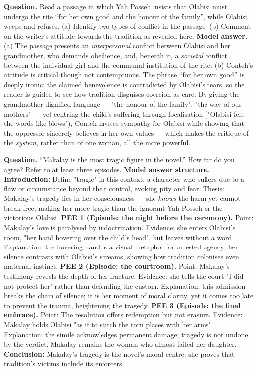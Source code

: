 \documentclass[11pt]{article}
\begin{document}
\begin{exoresolu}
\textbf{Question.} Read a passage in which Yah Posseh insists that Olabisi must undergo the rite ``for her own good and the honour of the family'', while Olabisi weeps and refuses. (a) Identify two types of conflict in the passage. (b) Comment on the writer's attitude towards the tradition as revealed here.
\tcblower
\textbf{Model answer.} (a) The passage presents an \emph{interpersonal} conflict between Olabisi and her grandmother, who demands obedience, and, beneath it, a \emph{societal} conflict between the individual girl and the communal institution of the rite. (b) Conteh's attitude is critical though not contemptuous. The phrase ``for her own good'' is deeply ironic: the claimed benevolence is contradicted by Olabisi's tears, so the reader is guided to see how tradition disguises coercion as care. By giving the grandmother dignified language --- "the honour of the family", "the way of our mothers" --- yet centring the child's suffering through focalisation ("Olabisi felt the words like blows"), Conteh invites sympathy for Olabisi while showing that the oppressor sincerely believes in her own values --- which makes the critique of the \emph{system}, rather than of one woman, all the more powerful.
\end{exoresolu}

\begin{exoresolu}
\textbf{Question.} ``Makalay is the most tragic figure in the novel.'' How far do you agree? Refer to at least three episodes.
\tcblower
\textbf{Model answer structure.}
\textbf{Introduction:} Define "tragic" in this context: a character who suffers due to a flaw or circumstance beyond their control, evoking pity and fear. Thesis: Makalay's tragedy lies in her consciousness --- she \emph{knows} the harm yet cannot break free, making her more tragic than the ignorant Yah Posseh or the victorious Olabisi.
\textbf{PEE 1 (Episode: the night before the ceremony).} Point: Makalay's love is paralysed by indoctrination. Evidence: she enters Olabisi's room, "her hand hovering over the child's head", but leaves without a word. Explanation: the hovering hand is a visual metaphor for arrested agency; her silence contrasts with Olabisi's screams, showing how tradition colonises even maternal instinct.
\textbf{PEE 2 (Episode: the courtroom).} Point: Makalay's testimony reveals the depth of her fracture. Evidence: she tells the court "I did not protect her" rather than defending the custom. Explanation: this admission breaks the chain of silence; it is her moment of moral clarity, yet it comes too late to prevent the trauma, heightening the tragedy.
\textbf{PEE 3 (Episode: the final embrace).} Point: The resolution offers redemption but not erasure. Evidence: Makalay holds Olabisi "as if to stitch the torn places with her arms". Explanation: the simile acknowledges permanent damage; tragedy is not undone by the verdict. Makalay remains the woman who almost failed her daughter.
\textbf{Conclusion:} Makalay's tragedy is the novel's moral centre: she proves that tradition's victims include its enforcers.
\end{exoresolu}
\end{document}
